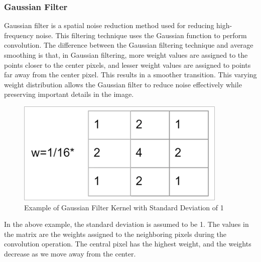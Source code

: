\documentclass[10pt]{article}
\begin{document}
\begin{multicols}{2}
\subsubsection{Gaussian Filter}
Gaussian filter is a spatial noise reduction method used for reducing high-frequency noise. This filtering technique uses the Gaussian function to perform convolution.
\newline \newline
The difference between the Gaussian filtering technique and average smoothing is that, in Gaussian filtering, more weight values are assigned to the points closer to the center pixels, and lesser weight values are assigned to points far away from the center pixel. This results in a smoother transition. This varying weight distribution allows the Gaussian filter to reduce noise effectively while preserving important details in the image.
\begin{figure}[H]
    \centering
    \includegraphics[width=0.7\linewidth]{Images/Week 3/gauss-kernel.png}
    \caption{Example of Gaussian Filter Kernel with Standard Deviation of 1}
\end{figure}
In the above example, the standard deviation is assumed to be 1. The values in the matrix are the weights assigned to the neighboring pixels during the convolution operation. The central pixel has the highest weight, and the weights decrease as we move away from the center.


\end{multicols}
\end{document}
